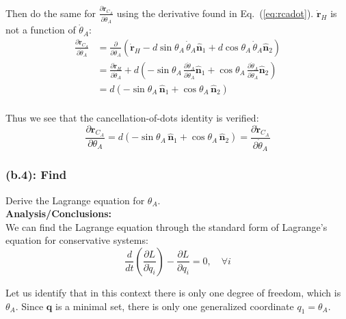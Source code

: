 \documentclass[titlepage]{article}
\begin{document}
Then do the same for $\frac{\partial\dot{\boldsymbol{r}}_{C_A}}{\partial\dot{\theta}_A}$ using the derivative found in Eq.~(\ref{eq:rcadot}). $\dot{\boldsymbol{r}}_H$ is not a function of $\dot{\theta}_A$:
\begin{equation}
	\begin{split}
		\frac{\partial\dot{\boldsymbol{r}}_{C_A}}{\partial\dot{\theta}_A}&=\frac{\partial}{\partial\dot{\theta}_A}\left(\dot{\boldsymbol{r}}_H-d\sin\theta_A\,\dot{\theta}_A\hat{\boldsymbol{n}}_1+d\cos\theta_A\,\dot{\theta}_A\hat{\boldsymbol{n}}_2\right) \\
		&= \frac{\partial\dot{\boldsymbol{r}}_H}{\partial\dot{\theta}_A}+d\left(-\sin\theta_A\,\frac{\partial\dot{\theta}_A}{\partial\dot{\theta}_A}\hat{\boldsymbol{n}}_1+\cos\theta_A\,\frac{\partial\dot{\theta}_A}{\partial\dot{\theta}_A}\hat{\boldsymbol{n}}_2\right) \\
		&=d\left(-\sin\theta_A\,\hat{\boldsymbol{n}}_1+\cos\theta_A\,\hat{\boldsymbol{n}}_2\right) \\
	\end{split}
\end{equation}

\begin{mdframed}[linewidth=1pt, innertopmargin=10pt, innerbottommargin=10pt]
	Thus we see that the cancellation-of-dots identity is verified:
	\begin{equation}
		\frac{\partial\boldsymbol{r}_{C_A}}{\partial\theta_A}=d\left(-\sin\theta_A\,\hat{\boldsymbol{n}}_1+\cos\theta_A\,\hat{\boldsymbol{n}}_2\right)=\frac{\partial\dot{\boldsymbol{r}}_{C_A}}{\partial\dot{\theta}_A}
	\end{equation}
\end{mdframed}

\subsubsection*{(b.4): Find}
Derive the Lagrange equation for $\theta_A$.\\

\textbf{Analysis/Conclusions:}\\
We can find the Lagrange equation through the standard form of Lagrange's equation for conservative systems:
\begin{equation}
	\frac{d}{dt}\left(\frac{\partial L}{\partial\dot{q}_i}\right)-\frac{\partial L}{\partial q_i}=0,\quad\forall i
	\label{eq:lagrangegeneral}
\end{equation}

Let us identify that in this context there is only one degree of freedom, which is $\theta_A$. Since $\boldsymbol{q}$ is a minimal set, there is only one generalized coordinate $q_1=\theta_A$.\\
\end{document}
